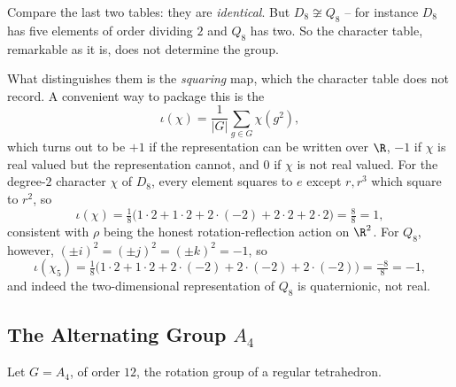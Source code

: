 \begin{remark}
	Compare the last two tables: they are \emph{identical}. But $D_8 \not\cong Q_8$ -- for instance $D_8$ has five elements of order dividing $2$ and $Q_8$ has two. So the character table, remarkable as it is, does not determine the group.

	What distinguishes them is the \emph{squaring} map, which the character table does not record. A convenient way to package this is the 
	$$\iota(\chi) = \frac1{|G|}\sum_{g\in G}\chi(g^2),$$
	which turns out to be $+1$ if the representation can be written over $\R$, $-1$ if $\chi$ is real valued but the representation cannot, and $0$ if $\chi$ is not real valued. For the degree-$2$ character $\chi$ of $D_8$, every element squares to $e$ except $r, r^3$ which square to $r^2$, so
	$$\iota(\chi) = \tfrac18\big(1\cdot 2 + 1\cdot 2 + 2\cdot(-2) + 2\cdot 2 + 2\cdot 2\big) = \tfrac88 = 1,$$
	consistent with $\rho$ being the honest rotation-reflection action on $\R^2$. For $Q_8$, however, $(\pm i)^2 = (\pm j)^2 = (\pm k)^2 = -1$, so
	$$\iota(\chi_5) = \tfrac18\big(1\cdot 2 + 1\cdot 2 + 2\cdot(-2) + 2\cdot(-2) + 2\cdot(-2)\big) = \tfrac{-8}{8} = -1,$$
	and indeed the two-dimensional representation of $Q_8$ is quaternionic, not real.
\end{remark}

\subsection{The Alternating Group \texorpdfstring{$A_4$}{A4}}

Let $G = A_4$, of order $12$, the rotation group of a regular tetrahedron.

\begin{center}
\end{center}

